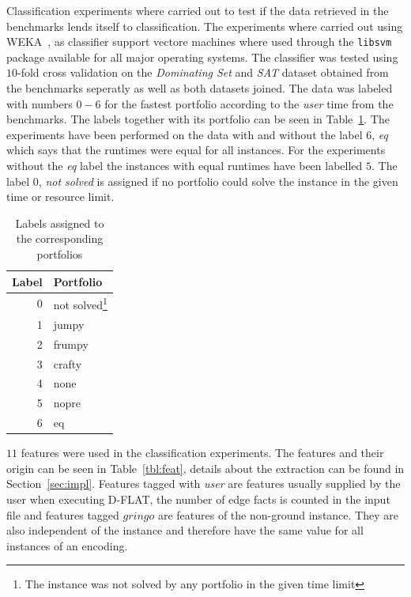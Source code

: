 Classification experiments where carried out to test if the data retrieved in the benchmarks lends itself to classification. The experiments where carried out using WEKA~\cite{WEKA}, as classifier support vectore machines where used through the \lstinline$libsvm$ package available for all major operating systems. The classifier was tested using $10$-fold cross validation on the \emph{Dominating Set} and \emph{SAT} dataset obtained from the benchmarks seperatly as well as both datasets joined. The data was labeled with numbers $0-6$ for the fastest portfolio according to the \emph{user} time from the benchmarks.
The labels together with its portfolio can be seen in Table~\ref{tbl:mlLabel}. The experiments have been performed on the data with and without the label $6$, \emph{eq} which says that the runtimes were equal for all instances. For the experiments without the \emph{eq} label the instances with equal runtimes have been labelled $5$. The label $0$, \emph{not solved} is assigned if no portfolio could solve the instance in the given time or resource limit.
\begin{table}[h]
	\center
	\begin{tabular}{|r|l|}
		\hline
		Label & Portfolio\\
		\hline
		0 & not solved\footnote{The instance was not solved by any portfolio in the given time limit} \\ %
		1 & jumpy\\
		2 & frumpy\\
		3 & crafty\\
		4 & none \\
		5 & nopre\\
		6 & eq\\
		\hline
	\end{tabular}
	\caption{Labels assigned to the corresponding portfolios}
	\label{tbl:mlLabel}
\end{table}


\par $11$ features were used in the classification experiments. The features and their origin can be seen in Table~\ref{tbl:feat}, details about the extraction can be found in Section~\ref{sec:impl}. Features tagged with \emph{user} are features usually supplied by the user when executing D-FLAT, the number of edge facts is counted in the input file and features tagged $gringo$ are features of the non-ground instance. They are also independent of the instance and therefore have the same value for all instances of an encoding. 

